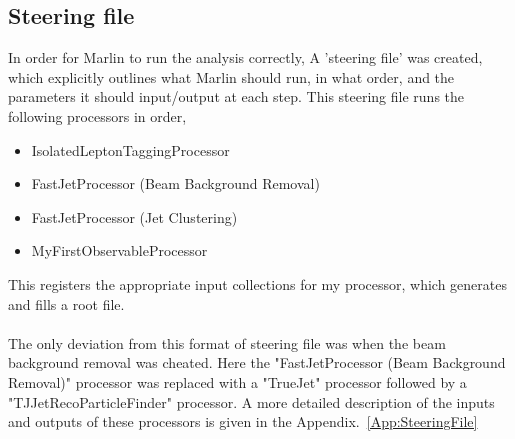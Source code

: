 \subsection{Steering file}
\label{SUBSEC:SteeringFile}

In order for Marlin to run the analysis correctly, A 'steering file’ was created, which explicitly outlines what Marlin should run, in what order, and the parameters it should input/output at each step. This steering file runs the following processors in order,
\begin{itemize}
	\item IsolatedLeptonTaggingProcessor
	\item FastJetProcessor (Beam Background Removal)
	\item FastJetProcessor (Jet Clustering)
	\item MyFirstObservableProcessor
\end{itemize}
This registers the appropriate input collections for my processor, which generates and fills a root file.
\\\\
The only deviation from this format of steering file was when the beam background removal was cheated. Here the "FastJetProcessor (Beam Background Removal)" processor was replaced with a "TrueJet"\cite{TrueJet} processor followed by a "TJJetRecoParticleFinder"\cite{TJJetRecoParticleFinder} processor. A more detailed description of the inputs and outputs of these processors is given in the Appendix.~\ref{App:SteeringFile}
